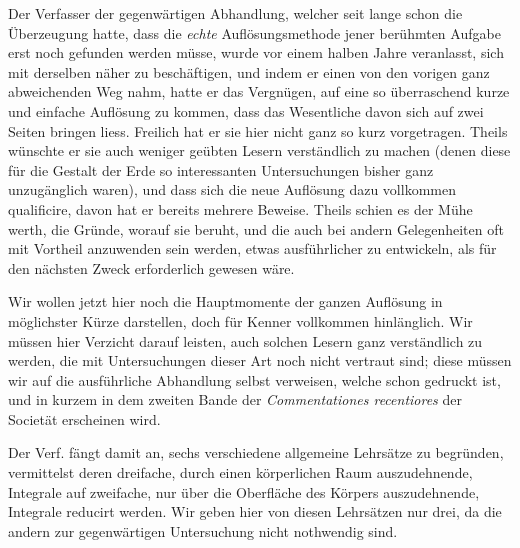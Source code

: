 Der Verfasser der gegenwärtigen Abhandlung, welcher seit lange schon die Überzeugung hatte, dass die \textit{echte} Auflösungsmethode jener berühmten Aufgabe erst noch gefunden werden müsse, wurde vor einem halben Jahre veranlasst, sich mit derselben näher zu beschäftigen, und indem er einen von den vorigen ganz abweichenden Weg nahm, hatte er das Vergnügen, auf eine so überraschend kurze und einfache Auflösung zu kommen, dass das Wesentliche davon sich auf zwei Seiten bringen liess. Freilich hat er sie hier nicht ganz so kurz vorgetragen. Theils wünschte er sie auch weniger geübten Lesern verständlich zu machen (denen diese für die Gestalt der Erde so interessanten Untersuchungen bisher ganz unzugänglich waren), und dass sich die neue Auflösung dazu vollkommen qualificire, davon hat er bereits mehrere Beweise. Theils schien es der Mühe werth, die Gründe, worauf sie beruht, und die auch bei andern Gelegenheiten oft mit Vortheil anzuwenden sein werden, etwas ausführlicher zu entwickeln, als für den nächsten Zweck erforderlich gewesen wäre.

Wir wollen jetzt hier noch die Hauptmomente der ganzen Auflösung in möglichster Kürze darstellen, doch für Kenner vollkommen hinlänglich. Wir müssen hier Verzicht darauf leisten, auch solchen Lesern ganz verständlich zu werden, die mit Untersuchungen dieser Art noch nicht vertraut sind; diese müssen wir auf die ausführliche Abhandlung selbst verweisen, welche schon gedruckt ist, und in kurzem in dem zweiten Bande der \textit{Commentationes recentiores} der Societät erscheinen wird.

Der Verf. fängt damit an, sechs verschiedene allgemeine Lehrsätze zu begründen, vermittelst deren dreifache, durch einen körperlichen Raum auszudehnende, Integrale auf zweifache, nur über die Oberfläche des Körpers auszudehnende, Integrale reducirt werden. Wir geben hier von diesen Lehrsätzen nur drei, da die andern zur gegenwärtigen Untersuchung nicht nothwendig sind.

